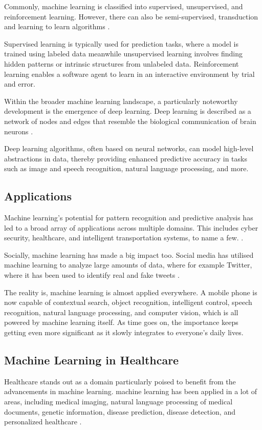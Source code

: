 Commonly, machine learning is classified into supervised, unsupervised, and reinforcement learning. However, there can also be semi-supervised, transduction and learning to learn algorithms \parencite{Oladipupo2010}. 

Supervised learning is typically used for prediction tasks, where a model is trained using labeled data meanwhile unsupervised learning involves finding hidden patterns or intrinsic structures from unlabeled data. Reinforcement learning enables a software agent to learn in an interactive environment by trial and error.

Within the broader machine learning landscape, a particularly noteworthy development is the emergence of deep learning. Deep learning is described as a network of nodes and edges that resemble the biological communication of brain neurons \parencite{Dinov2018}. 

Deep learning algorithms, often based on neural networks, can model high-level abstractions in data, thereby providing enhanced predictive accuracy in tasks such as image and speech recognition, natural language processing, and more.

\newpage
\subsection{Applications}
Machine learning's potential for pattern recognition and predictive analysis has led to a broad array of applications across multiple domains. This includes cyber security, healthcare, and intelligent transportation systems, to name a few. \parencite{Jhaveri2022}.

Socially, machine learning has made a big impact too. Social media has utilised machine learning to analyze large amounts of data, where for example Twitter, where it has been used to identify real and fake tweets \parencite{Arora2018}.

The reality is, machine learning is almost applied everywhere. A mobile phone is now capable of contextual search, object recognition, intelligent control, speech recognition, natural language processing, and computer vision, which is all powered by machine learning itself. As time goes on, the importance keeps getting even more significant as it slowly integrates to everyone's daily lives.

\newpage
\subsection{Machine Learning in Healthcare}
Healthcare stands out as a domain particularly poised to benefit from the advancements in machine learning. machine learning has been applied in a lot of areas, including medical imaging, natural language processing of medical documents, genetic information, disease prediction, disease detection, and personalized healthcare \parencite{Mana2022}.

